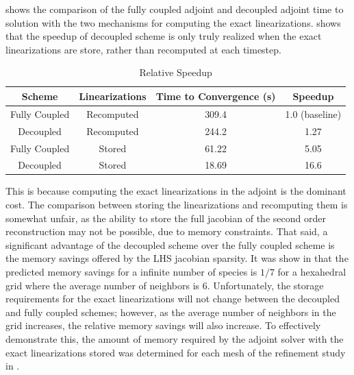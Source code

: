  shows the comparison of the fully coupled adjoint and 
decoupled adjoint time to solution with the two mechanisms for computing the
exact linearizations.   shows that the speedup of
decoupled scheme is only truly realized when the exact linearizations are store,
rather than recomputed at each timestep. 
\begin{table}[h]
  \centering
  \begin{tabular}{c|c|c|c}
    Scheme & Linearizations & Time to Convergence (s) & Speedup \\
    \hline
    Fully Coupled & Recomputed  & 309.4 & 1.0 (baseline)\\
    Decoupled     & Recomputed  & 244.2 & 1.27 \\
    Fully Coupled & Stored      & 61.22 & 5.05 \\
    Decoupled     & Stored      & 18.69 & 16.6 \\
  \end{tabular}
  \caption{Relative Speedup}
  \label{tab:srp-rel-speedup}
\end{table}
This is because computing the exact linearizations in the adjoint is the
dominant cost.  The comparison between storing the linearizations and
recomputing them is somewhat unfair, as the ability to store the full jacobian
of the second order reconstruction may not be possible, due to memory
constraints.  That said, a significant advantage of the decoupled scheme over
the fully coupled scheme is the memory savings offered by the LHS jacobian
sparsity. It was show in  that the
predicted memory savings for a infinite number of species is $1/7$ for a
hexahedral grid where the average number of neighbors is 6.  Unfortunately, the
storage requirements for the exact linearizations will not change between the
decoupled and fully coupled schemes; however, as the average number of neighbors
in the grid increases, the relative memory savings will also increase.  To
effectively demonstrate this, the amount of memory required by the adjoint
solver with the exact linearizations stored was determined for each mesh of the
refinement study in .
